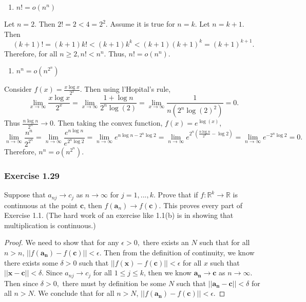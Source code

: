 \documentclass[12pt,]{article}
\providecommand{\tightlist}{%
  \setlength{\itemsep}{0pt}\setlength{\parskip}{0pt}}
\begin{document}
\begin{enumerate}
\def\labelenumi{(\arabic{enumi})}
\setcounter{enumi}{10}
\tightlist
\item
  \(n!= o\left(n^n\right)\)
\end{enumerate}

Let \(n = 2.\) Then \(2! = 2 < 4 = 2^2\). Assume it is true for
\(n =k.\) Let \(n = k+1.\) Then
\[(k+1)! = (k+1)k!<(k+1)k^k<(k+1)(k+1)^k=(k+1)^{k+1}.\] Therefore, for
all \(n\ge 2, n! < n^n\). Thus, \(n!= o\left(n^n\right).\)

\begin{enumerate}
\def\labelenumi{(\arabic{enumi})}
\setcounter{enumi}{11}
\tightlist
\item
  \(n^n = o\left(n^{2^n}\right)\)
\end{enumerate}

Consider \(f(x) = \frac{x\log x}{2^x}.\) Then using l'Hopital's rule,
\[\lim_{x\rightarrow\infty}\frac{x\log x}{2^x}=\lim_{x\rightarrow\infty}\frac{1+\log n}{2^n\log(2)}=\lim_{x\rightarrow\infty}\frac{1}{n(2^n\log(2)^2)}=0.\]
Thus \(\frac{n\log n}{2^n}\rightarrow 0\). Then taking the convex
function, \(f(x) = e^{\log(x)}\),
\[\lim_{n\rightarrow\infty}\frac{n^n}{2^{2^n}}=\lim_{n\rightarrow\infty}\frac{e^{n\log n}}{e^{2^n\log2}}=\lim_{n\rightarrow\infty}e^{n\log n-2^n\log 2}=\lim_{n\rightarrow\infty}e^{2^n(\frac{n\log n}{2^n}-\log 2)}=\lim_{n\rightarrow\infty}e^{-2^n\log 2}=0.\]
Therefore, \(n^n = o\left(n^{2^n}\right)\).

\hypertarget{exercise-1.29}{%
\subsubsection{Exercise 1.29}\label{exercise-1.29}}

Suppose that \(a_{nj} \rightarrow c_j\) as \(n\rightarrow \infty\) for
\(j = 1, ..., k.\) Prove that if
\(f:\mathbb{R}^k \rightarrow \mathbb{R}\) is continuous at the point
\(\boldsymbol{c}\), then
\(f(\boldsymbol{a}_n)\rightarrow f(\boldsymbol{c}).\) This proves every
part of Exercise 1.1. (The hard work of an exercise like 1.1(b) is in
showing that multiplication is continuous.)

\begin{proof}
We need to show that for any $\epsilon>0,$ there exists an $N$ such that for all $n>n$, $||f(\boldsymbol{a_n})-f(\boldsymbol{c})||<\epsilon$. Then from the definition of continuity, we know there exists some $\delta >0$ such that $||f(\boldsymbol{x})-f(\boldsymbol{c})||<\epsilon$ for all $x$ such that $||\boldsymbol{x}-\boldsymbol{c}||<\delta.$ Since $a_{nj}\rightarrow c_j$ for all $1\le j \le k$, then we know $\boldsymbol{a_n}\rightarrow \boldsymbol{c}$ as $n\rightarrow \infty$. Then since $\delta >0,$ there must by definition be some $N$ such that $||\boldsymbol{a_n}-\boldsymbol{c}||<\delta$ for all $n>N.$ We conclude that for all $n>N$, $||f(\boldsymbol{a_n})-f(\boldsymbol{c})||<\epsilon.$
\end{proof}
\end{document}
